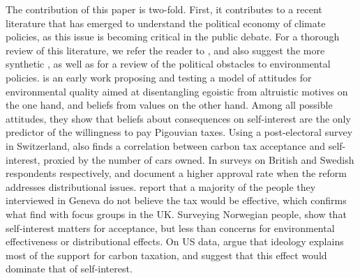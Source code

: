 \documentclass[12pt]{article} %
\begin{document}
The contribution of this paper is two-fold. First, it contributes to a recent literature that has emerged to understand the political economy of climate policies, as this issue is becoming critical in the public debate. For a thorough review of this literature, we refer the reader to  \citet{carattini_overcoming_2018}, and also suggest the more synthetic \citet{klenert_making_2018}, as well as \citet{millner_beliefs_2016} for a review of the political obstacles to environmental policies. \citet{stern_value_1993} is an early work proposing and testing a model of attitudes for environmental quality aimed at disentangling egoistic from altruistic motives on the one hand, and beliefs from values on the other hand. Among all possible attitudes, they show that beliefs about consequences on self-interest are the only predictor of the willingness to pay Pigouvian taxes. Using a post-electoral survey in Switzerland, \citet{thalmann_public_2004} also finds a correlation between carbon tax acceptance and self-interest, proxied by the number of cars owned. In surveys on British and Swedish respondents respectively, \citet{bristow_public_2010} and \citet{brannlund_tax_2012} document a higher approval rate when the reform addresses distributional issues. \citet{baranzini_effectiveness_2017} report that a majority of the people they interviewed in Geneva do not believe the tax would be effective, which confirms what \citet{dresner_history_2006} find with focus groups in the UK. Surveying Norwegian people, \citet{kallbekken_saelen_2011} show that self-interest matters for acceptance, but less than concerns for environmental effectiveness or distributional effects. On US data, \citet{anderson_can_2019} argue that ideology explains most of the support for carbon taxation, and suggest that this effect would dominate that of self-interest.
\end{document}
